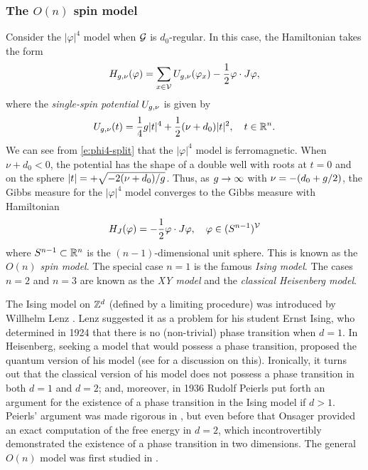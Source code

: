 \subsubsection{The $O(n)$ spin model}

Consider the $|\varphi|^4$ model when $\mathcal{G}$ is $d_0$-regular. In this case,
the Hamiltonian takes the form
\begin{equation}
\label{e:phi4-split}
H_{g,\nu}(\varphi)
  =
\sum_{x\in\mathcal{V}} U_{g,\nu}(\varphi_x) - \frac{1}{2} \varphi \cdot J \varphi,
\end{equation}
where the \emph{single-spin potential} $U_{g,\nu}$ is given by
\begin{equation}
U_{g,\nu}(t)
	=
\frac{1}{4} g |t|^4
	+
\frac{1}{2} (\nu + d_0) |t|^2,
	\quad
t \in {\mathbb R}^n.
\end{equation}
We can see from \eqref{e:phi4-split} that the $|\varphi|^4$ model is ferromagnetic.
When $\nu + d_0 < 0$, the potential has the shape of a double well with roots at
$t = 0$ and on the sphere $|t| = +\sqrt{-2 (\nu + d_0) / g}$.
Thus, as $g\rightarrow\infty$ with $\nu = -(d_0 + g/2)$, the Gibbs measure for the
$|\varphi|^4$ model converges to the Gibbs measure with Hamiltonian
\begin{equation}
\label{e:on-model}
H_J(\varphi) = -\frac12 \varphi \cdot J \varphi,
	\quad
\varphi \in (S^{n-1})^{\mathcal{V}}
\end{equation}
where $S^{n-1} \subset {\mathbb R}^n$ is the $(n-1)$-dimensional unit sphere.
This is known as the \emph{$O(n)$ spin model}. The special case $n = 1$ is the
famous \emph{Ising model}. The cases $n = 2$ and $n = 3$ are known as the
\emph{XY model} and the \emph{classical Heisenberg model}.

\begin{rk}
The Ising model on ${ {{\mathbb Z}}^d }$ (defined by a limiting procedure) was introduced
by Willhelm Lenz \cite{Lenz20}. Lenz
suggested it as a problem for his student Ernst Ising, who determined in 1924
\cite{Ising25} that there is no (non-trivial) phase transition when $d = 1$.
In \cite{Heisenberg28} Heisenberg, seeking a model that would possess a phase
transition, proposed the quantum version of his model (see \cite{Brush67} for
a discussion on this). Ironically, it turns out that the classical version of
his model does not possess a phase transition in both $d = 1$ and $d = 2$; and,
moreover, in 1936 Rudolf Peierls \cite{Peierls36} put forth an argument for the
existence of a phase transition in the Ising model if $d > 1$. Peierls' argument
was made rigorous in \cite{Griffiths64}, but even before that Onsager \cite{Onsager44}
provided an exact computation of the free energy in $d = 2$, which incontrovertibly
demonstrated the existence of a phase transition in two dimensions. The general
$O(n)$ model was first studied in \cite{Stanley68}.
\end{rk}

